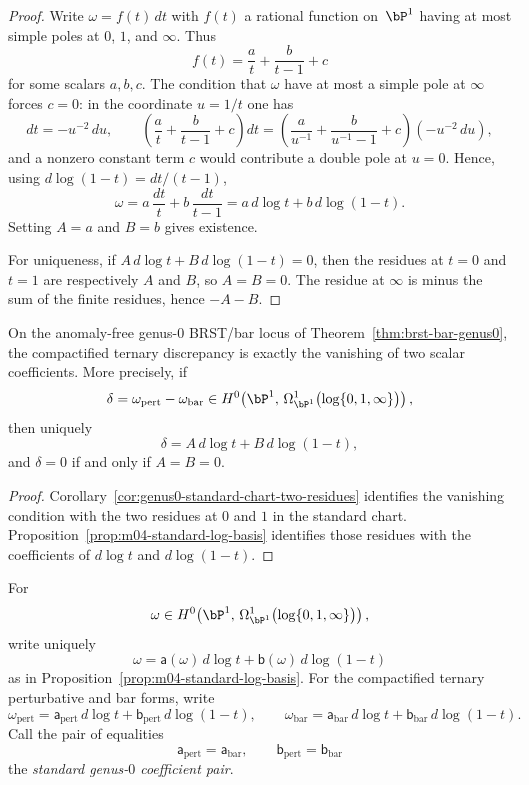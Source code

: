 \begin{proof}
Write $\omega = f(t)\,dt$ with $f(t)$ a rational function on~$\bP^1$
having at most simple poles at $0$, $1$, and $\infty$.
Thus
\[
f(t)=\frac{a}{t}+\frac{b}{t-1}+c
\]
for some scalars $a,b,c$. The condition that $\omega$ have at most a
simple pole at $\infty$ forces $c=0$: in the coordinate $u=1/t$ one
has
\[
dt = -u^{-2}\,du,\qquad
\left(\frac{a}{t}+\frac{b}{t-1}+c\right)dt
= \left(\frac{a}{u^{-1}}+\frac{b}{u^{-1}-1}+c\right)(-u^{-2}\,du),
\]
and a nonzero constant term $c$ would contribute a double pole at
$u=0$.
Hence, using $d\log(1-t) = dt/(t-1)$,
\[
\omega = a\,\frac{dt}{t}+b\,\frac{dt}{t-1}
= a\, d\log t + b\, d\log(1-t).
\]
Setting $A=a$ and $B=b$ gives existence.

For uniqueness, if
$A\, d\log t + B\, d\log(1-t)=0$, then the residues at
$t=0$ and $t=1$ are respectively $A$ and $B$, so $A=B=0$.
The residue at $\infty$ is minus the sum of the finite residues, hence
$-A-B$.
\end{proof}

\begin{corollary}
\label{cor:genus0-two-coefficient-discrepancy}
On the anomaly-free genus-$0$ BRST/bar locus of
Theorem~\ref{thm:brst-bar-genus0}, the compactified ternary discrepancy
is exactly the vanishing of two scalar coefficients. More precisely, if
\[
\delta = \omega_{\mathrm{pert}} - \omega_{\mathrm{bar}}
\in H^0\!\left(\bP^1,\,
\Omega^1_{\bP^1}\bigl(\log\{0,1,\infty\}\bigr)\right),
\]
then uniquely
\[
\delta = A\, d\log t + B\, d\log(1-t),
\]
and \(\delta=0\) if and only if \(A=B=0\).
\end{corollary}

\begin{proof}
Corollary~\ref{cor:genus0-standard-chart-two-residues} identifies the
vanishing condition with the two residues at $0$ and $1$ in the
standard chart. Proposition~\ref{prop:m04-standard-log-basis}
identifies those residues with the coefficients of \(d\log t\) and
\(d\log(1-t)\).
\end{proof}

\begin{definition}
\label{def:genus0-coefficient-pair}
For
\[
\omega \in H^0\!\left(\bP^1,\,
\Omega^1_{\bP^1}\bigl(\log\{0,1,\infty\}\bigr)\right),
\]
write uniquely
\[
\omega=\mathsf{a}(\omega)\,d\log t+\mathsf{b}(\omega)\,d\log(1-t)
\]
as in Proposition~\ref{prop:m04-standard-log-basis}. For the
compactified ternary perturbative and bar forms, write
\[
\omega_{\mathrm{pert}}
= \mathsf{a}_{\mathrm{pert}}\,d\log t
 + \mathsf{b}_{\mathrm{pert}}\,d\log(1-t),
\qquad
\omega_{\mathrm{bar}}
= \mathsf{a}_{\mathrm{bar}}\,d\log t
 + \mathsf{b}_{\mathrm{bar}}\,d\log(1-t).
\]
Call the pair of equalities
\[
\mathsf{a}_{\mathrm{pert}}=\mathsf{a}_{\mathrm{bar}},
\qquad
\mathsf{b}_{\mathrm{pert}}=\mathsf{b}_{\mathrm{bar}}
\]
the \emph{standard genus-$0$ coefficient pair}.
\end{definition}

